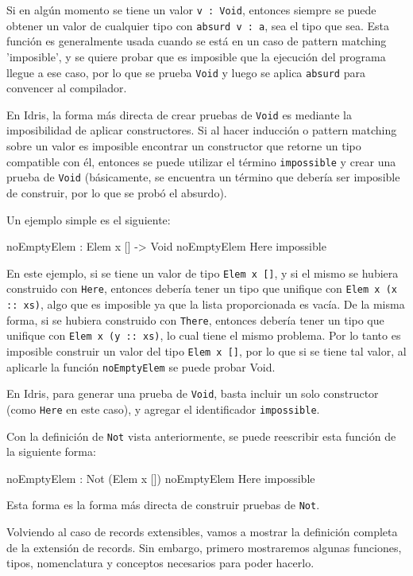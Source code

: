 Si en algún momento se tiene un valor \texttt{v : Void}, entonces siempre se puede obtener un valor de cualquier tipo con \texttt{absurd v : a}, sea el tipo que sea. Esta función es generalmente usada cuando se está en un caso de pattern matching 'imposible', y se quiere probar que es imposible que la ejecución del programa llegue a ese caso, por lo que se prueba \texttt{Void} y luego se aplica \texttt{absurd} para convencer al compilador.

En Idris, la forma más directa de crear pruebas de \texttt{Void} es mediante la imposibilidad de aplicar constructores. Si al hacer inducción o pattern matching sobre un valor es imposible encontrar un constructor que retorne un tipo compatible con él, entonces se puede utilizar el término \texttt{impossible} y crear una prueba de \texttt{Void} (básicamente, se encuentra un término que debería ser imposible de construir, por lo que se probó el absurdo).

Un ejemplo simple es el siguiente:

\begin{code}
noEmptyElem : Elem x [] -> Void
noEmptyElem Here impossible
\end{code}

En este ejemplo, si se tiene un valor de tipo \texttt{Elem x []}, y si el mismo se hubiera construido con \texttt{Here}, entonces debería tener un tipo que unifique con \texttt{Elem x (x :: xs)}, algo que es imposible ya que la lista proporcionada es vacía. De la misma forma, si se hubiera construido con \texttt{There}, entonces debería tener un tipo que unifique con \texttt{Elem x (y :: xs)}, lo cual tiene el mismo problema. Por lo tanto es imposible construir un valor del tipo \texttt{Elem x []}, por lo que si se tiene tal valor, al aplicarle la función \texttt{noEmptyElem} se puede probar Void.

En Idris, para generar una prueba de \texttt{Void}, basta incluir un solo constructor (como \texttt{Here} en este caso), y agregar el identificador \texttt{impossible}.

Con la definición de \texttt{Not} vista anteriormente, se puede reescribir esta función de la siguiente forma:

\begin{code}
noEmptyElem : Not (Elem x [])
noEmptyElem Here impossible
\end{code}

Esta forma es la forma más directa de construir pruebas de \texttt{Not}.

Volviendo al caso de records extensibles, vamos a mostrar la definición completa de la extensión de records. Sin embargo, primero mostraremos algunas funciones, tipos, nomenclatura y conceptos necesarios para poder hacerlo.

